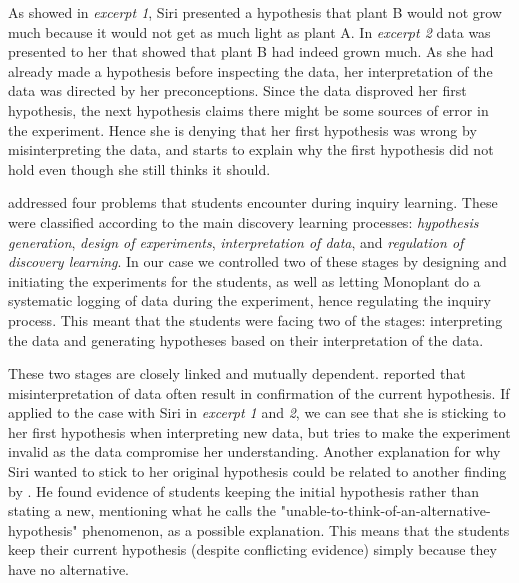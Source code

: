 As showed in \emph{excerpt 1}, Siri presented a hypothesis that plant B would not grow much because it would not get as much light as plant A. In \emph{excerpt 2} data was presented to her that showed that plant B had indeed grown much. As she had already made a hypothesis before inspecting the data, her interpretation of the data was directed by her preconceptions. Since the data disproved her first hypothesis, the next hypothesis claims there might be some sources of error in the experiment. Hence she is denying that her first hypothesis was wrong by misinterpreting the data, and starts to explain why the first hypothesis did not hold even though she still thinks it should.

\citet{de1998scientific} addressed four problems that students encounter during inquiry learning. These were classified according to the main discovery learning processes: \textit{hypothesis generation}, \textit{design of experiments}, \textit{interpretation of data}, and \textit{regulation of discovery learning}. In our case we controlled two of these stages by designing and initiating the experiments for the students, as well as letting Monoplant do a systematic logging of data during the experiment, hence regulating the inquiry process. This meant that the students were facing two of the stages: interpreting the data and generating hypotheses based on their interpretation of the data. 

These two stages are closely linked and mutually dependent. \citeauthor*{klahr1993heuristics} \citetext{\citeyear{klahr1993heuristics}, referenced in \citealp{de1998scientific}} reported that misinterpretation of data often result in confirmation of the current hypothesis. If applied to the case with Siri in \emph{excerpt 1} and \emph{2}, we can see that she is sticking to her first hypothesis when interpreting new data, but tries to make the experiment invalid as the data compromise her understanding. Another explanation for why Siri wanted to stick to her original hypothesis could be related to another finding by \citeauthor*{dunbar1993concept} \citetext{\citeyear{dunbar1993concept}, referenced in \citealp{de1998scientific}}. He found evidence of students keeping the initial hypothesis rather than stating a new, mentioning what he calls the "unable-to-think-of-an-alternative-hypothesis" phenomenon, as a possible explanation. This means that the students keep their current hypothesis (despite conflicting evidence) simply because they have no alternative.

